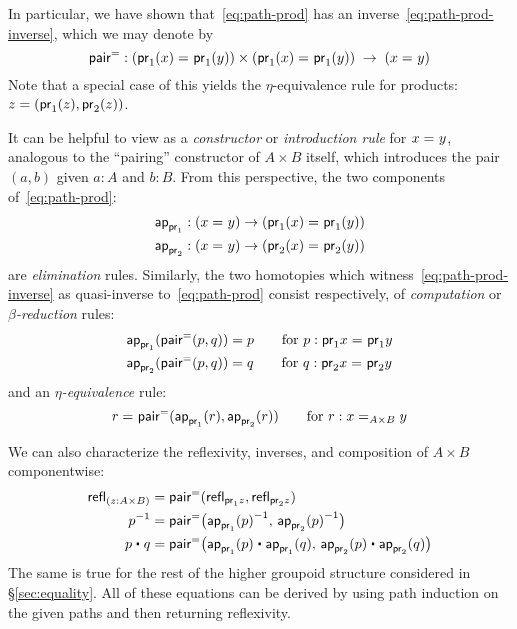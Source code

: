 In particular, we have shown that~\eqref{eq:path-prod} has an inverse~\eqref{eq:path-prod-inverse}, which we may denote by
\[
\pairpath : (\id{\proj{1}(x)}{\proj{1}(y)}) \times (\id{\proj{1}(x)}{\proj{1}(y)}) \;\to\; {(\id x y)}
\]
Note that a special case of this yields the $\eta$-equivalence rule for products: $z = (\proj1(z),\proj2(z))$.

It can be helpful to view \pairpath as a \emph{constructor} or \emph{introduction rule} for $\id x y$, analogous to the ``pairing'' constructor of $A\times B$ itself, which introduces the pair $(a,b)$ given $a:A$ and $b:B$.
From this perspective, the two components of~\eqref{eq:path-prod}:
\begin{align*}
  \projpath{1} &: (\id{x}{y}) \to (\id{\proj{1}(x)}{\proj{1} (y)})\\
  \projpath{2} &: (\id{x}{y}) \to (\id{\proj{2}(x)}{\proj{2} (y)})
\end{align*}
are \emph{elimination} rules.
Similarly, the two homotopies which witness~\eqref{eq:path-prod-inverse} as quasi-inverse to~\eqref{eq:path-prod} consist respectively, of \emph{computation} or \emph{$\beta$-reduction} rules:
\begin{align*}
  {\projpath{1}{(\pairpath(p, q)})}
  &= %
  {p} \qquad\text{for } p:\id{\proj{1} x}{\proj{1} y} \\
  {\projpath{2}{(\pairpath(p,q)})}
  &= %
  {q} \qquad\text{for } q:\id{\proj{2} x}{\proj{2} y}
\end{align*}
and an \emph{$\eta$-equivalence} rule:
\[
\id{r}{\pairpath(\projpath{1} (r), \projpath{2} (r)) }
\qquad\text{for } r : \id[A \times B] x y
\]

We can also characterize the reflexivity, inverses, and composition of $A\times B$ componentwise:
\begin{align*}
  {\refl{(z : A \times B)}}
  &= {\pairpath (\refl{\proj{1} z},\refl{\proj{2} z})} \\
  {\opp{p}}
  &= {\pairpath \big(\opp{\projpath{1} (p)},\, \opp{\projpath{2} (p)}\big)} \\
  {{p \ct q}}
  &= {\pairpath \big({\projpath{1} (p)} \ct {\projpath{1} (q)},\,{\projpath{2} (p)} \ct {\projpath{2} (q)}\big)}
\end{align*}
The same is true for the rest of the higher groupoid structure considered in \S\ref{sec:equality}.
All of these equations can be derived by using path induction on the given paths and then returning reflexivity.  

